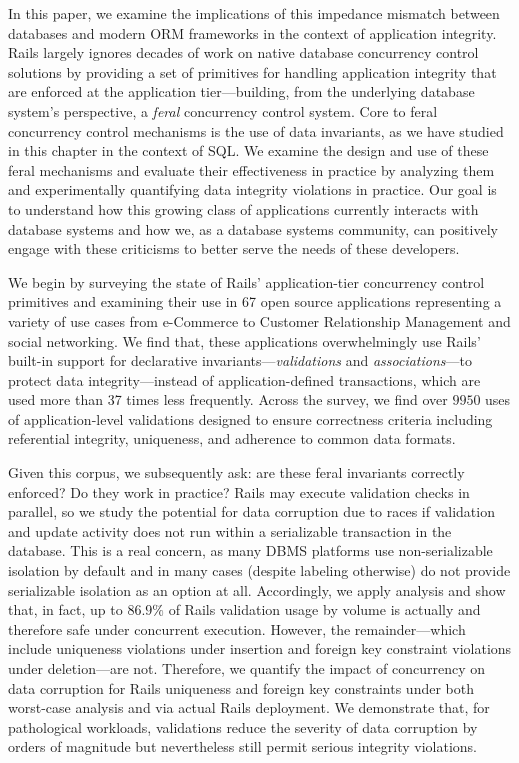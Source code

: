 In this paper, we examine the implications of this impedance mismatch
between databases and modern ORM frameworks in the context of
application integrity. Rails largely ignores decades of work on native
database concurrency control solutions by providing a set of
primitives for handling application integrity that are enforced at the
application tier---building, from the underlying database system's
perspective, a \textit{feral} concurrency control system. Core to
feral concurrency control mechanisms is the use of data invariants, as
we have studied in this chapter in the context of SQL. We examine the
design and use of these feral mechanisms and evaluate their
effectiveness in practice by analyzing them and experimentally
quantifying data integrity violations in practice. Our goal is to
understand how this growing class of applications currently interacts
with database systems and how we, as a database systems community, can
positively engage with these criticisms to better serve the needs of
these developers.

We begin by surveying the state of Rails' application-tier concurrency
control primitives and examining their use in 67 open source
applications representing a variety of use cases from e-Commerce to
Customer Relationship Management and social networking. We find that,
these applications overwhelmingly use Rails' built-in support for
declarative invariants---\textit{validations} and
\textit{associations}---to protect data integrity---instead of
application-defined transactions, which are used more than 37 times less
frequently. Across the survey, we find over $9950$ uses of
application-level validations designed to ensure correctness criteria
including referential integrity, uniqueness, and adherence to common
data formats.

Given this corpus, we subsequently ask: are these feral invariants
correctly enforced? Do they work in practice? Rails may execute
validation checks in parallel, so we study the potential for data
corruption due to races if validation and update activity does not run
within a serializable transaction in the database. This is a real
concern, as many DBMS platforms use non-serializable isolation by
default and in many cases (despite labeling otherwise) do not provide
serializable isolation as an option at all.  Accordingly, we apply
\iconfluence analysis and show that, in fact, up to $86.9\%$ of Rails
validation usage by volume is actually \iconfluent and therefore safe
under concurrent execution. However, the remainder---which include
uniqueness violations under insertion and foreign key constraint
violations under deletion---are not. Therefore, we quantify the impact
of concurrency on data corruption for Rails uniqueness and foreign key
constraints under both worst-case analysis and via actual Rails
deployment. We demonstrate that, for pathological workloads,
validations reduce the severity of data corruption by orders of
magnitude but nevertheless still permit serious integrity violations.

